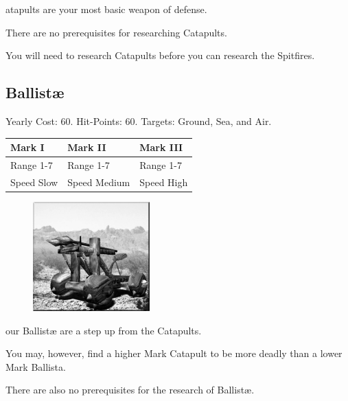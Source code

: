 atapults are your most basic weapon of defense. 

There are no prerequisites for researching Catapults. 

You will need to research Catapults before you can research the Spitfires.

\subsection{Ballistæ}



\begin{center}
	Yearly Cost: 60. Hit-Points: 60. Targets: Ground, Sea, and Air.
\end{center}

\begin{tabular}{ | p{1.3in} | p{1.3in} | p{1.3in} |}
	\hline
	\textbf{Mark I}	& \textbf{Mark II} & \textbf{Mark III} \\ \hline
	Range 1-7	& Range 1-7& Range 1-7 \\ \hline
	Speed Slow	& Speed Medium & Speed High \\ \hline
\end{tabular}

\begin{figure}
	\vspace{-20pt}
	\begin{center}
		\includegraphics[width=0.4\textwidth]{Aballista}
	\end{center}
\end{figure}

our Ballistæ are a step up from the Catapults.

You may, however, find a higher Mark Catapult to be more deadly than a lower Mark Ballista.

There are also no prerequisites for the research of Ballistæ.

